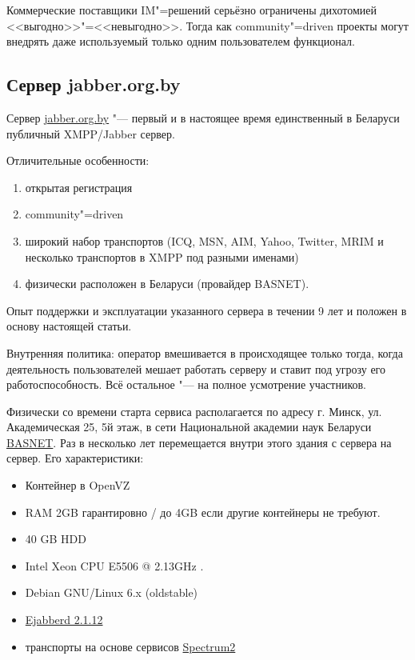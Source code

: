\documentclass[10pt, a5paper]{article}
\begin{document}
Коммерческие поставщики IM"=решений серьёзно ограничены дихотомией <<выгодно>>"=<<невыгодно>>. Тогда как community"=driven проекты могут внедрять даже используемый только одним пользователем функционал.

\subsection*{Сервер jabber.org.by}

Сервер \href{http://jabber.org.by}{jabber.org.by} "--- первый и в настоящее время единственный в Беларуси публичный XMPP/Jabber сервер.

Отличительные особенности:

\begin{enumerate}
  \item открытая регистрация
  \item community"=driven
  \item широкий набор транспортов (ICQ, MSN, AIM, Yahoo, Twitter, MRIM и несколько транспортов в XMPP под разными именами)
  \item физически расположен в Беларуси (провайдер BASNET).
\end{enumerate}

Опыт поддержки и эксплуатации указанного сервера в течении 9 лет и положен в основу  настоящей статьи.

Внутренняя политика: оператор вмешивается в происходящее только тогда, когда деятельность пользователей мешает работать серверу и ставит под угрозу его работоспособность. Всё остальное "--- на полное усмотрение участников.

Физически со времени старта сервиса располагается по адресу г. Минск, ул. Академическая 25, 5й этаж, в сети Национальной академии наук Беларуси \href{http://basnet.by}{BASNET}. Раз в несколько лет перемещается внутри этого здания с сервера на сервер. Его характеристики:

\begin{itemize}
  \item Контейнер в OpenVZ
  \item RAM 2GB гарантировно /  до 4GB если другие контейнеры не требуют.
  \item 40 GB HDD
  \item Intel\textregistered{} Xeon\textregistered{} CPU E5506  @ 2.13GHz . 
  \item Debian GNU/Linux 6.x (oldstable)
  \item \href{http://www.process"=one.net/en/ejabberd}{Ejabberd 2.1.12}
  \item транспорты на основе сервисов \href{http://spectrum.im}{Spectrum2}
\end{itemize}
\end{document}

